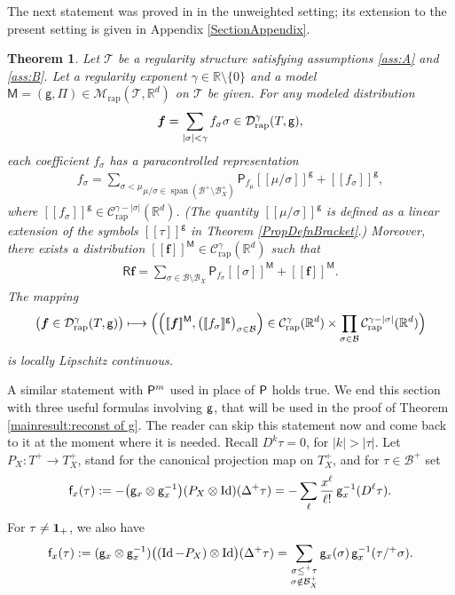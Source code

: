 \documentclass[10pt]{amsart}
\newcommand\mto{\mathchoice{\longmapsto}{\mapsto}{\mapsto}{\mapsto}}
\DeclareMathOperator{\Span}{span}
\theoremstyle{plain}
\newtheorem{thm}{Theorem}
\theoremstyle{definition}
\DeclareMathOperator{\iden}{Id}
\newcommand{\Brac}[1]{[\![#1]\!]}
\newcommand{\bsf}{\boldsymbol{f}}
\newcommand{\rap}{\mathrm{rap}}
\newcommand{\reR}{\boldsymbol{\mathsf{R}}}
\newcommand{\sfM}{\mathsf{M}}
\newcommand{\sfP}{\mathsf{P}}
\newcommand{\sff}{\mathsf{f}}
\newcommand{\sfg}{\mathsf{g}}
\newcommand{\sfPi}{\mathsf{\Pi}}
\newcommand{\scrM}{\mathscr{M}}
\newcommand{\scrT}{\mathscr{T}}
\newcommand{\bbR}{\mathbb{R}}
\newcommand{\mcB}{\mathcal{B}}
\newcommand{\mcC}{\mathcal{C}}
\newcommand{\mcD}{\mathcal{D}}
\begin{document}
The next statement was proved in \cite[Th.\,14]{BH} in the unweighted setting; its extension to the present setting is given in Appendix \ref{SectionAppendix}.

\begin{thm} \label{thm:MD to PD}
Let $\scrT$ be a regularity structure satisfying assumptions \eqref{ass:A} and \eqref{ass:B}. Let a regularity exponent $\gamma\in\bbR\setminus\{0\}$ and a model $\sfM=(\sfg,\sfPi)\in\scrM_\rap(\scrT,\bbR^d)$ on $\scrT$ be given. For any modeled distribution
\[
\bsf=\sum_{|\sigma|<\gamma}f_\sigma\sigma\in\mcD_\rap^\gamma(T,\sf g),
\]
each coefficient $f_\sigma$ has a paracontrolled representation
\begin{align}\label{eq:para system}
f_\sigma = \underset{\mu/\sigma\in\Span(\mcB^+\setminus\mcB_X^+)}{\sum_{\sigma<\mu}} \sfP_{f_\mu}\Brac{\mu/\sigma}^\sfg + \Brac{f_\sigma}^\sfg,
\end{align}
where $\Brac{f_\sigma}^\sfg\in \mcC_\rap^{\gamma-|\sigma|}(\bbR^d)$. (The quantity $\Brac{\mu/\sigma}^{\sfg}$ is defined as a linear extension of the symbols $\Brac{\tau}^{\sfg}$ in Theorem \ref{PropDefnBracket}.) Moreover, there exists a distribution $\Brac{\bsf}^\sfM\in \mcC_\rap^\gamma(\bbR^d)$ such that
\begin{align}\label{eq:para reconst}
\reR\bsf=\sum_{\sigma\in\mcB\setminus\mcB_{\underline{X}}} \sfP_{f_\sigma}\Brac{\sigma}^\sfM+\Brac{\bsf}^\sfM.
\end{align}
The mapping
\[
\bigl(\bsf\in\mcD_\rap^\gamma(T,{\sf g})\bigr)\mto \Bigl( \Bigl(\Brac{\bsf}^\sfM,\bigl(\Brac{f_\sigma}^\sfg\bigr)_{\sigma\in\mcB}\Bigr) \in \mcC^\gamma_\rap(\bbR^d)\times\prod_{\sigma\in\mcB} \mcC^{\gamma-\vert\sigma\vert}_\rap(\bbR^d) \Bigr)
\]
is locally Lipschitz continuous.
\end{thm}

A similar statement with ${\sf P}^m$ used in place of $\sf P$ holds true. We end this section with three useful formulas involving $\sf g$, that will be used in the proof of Theorem \ref{mainresult:reconst of g}. The reader can skip this statement now and come back to it at the moment where it is needed. Recall $D^k\tau=0$, for $\vert k\vert>\vert\tau\vert$. Let $P_X: T^+\to T^+_X$, stand for the canonical projection map on $T^+_X$, and for $\tau\in\mcB^+$ set
\begin{equation*}
\sff_x(\tau) := - \bigl({\sf g}_x\otimes {\sf g}_x^{-1}\bigr)(P_X\otimes\iden)(\Delta^+\tau) 
 = - \sum_{\ell}\frac{x^\ell}{\ell!} \, \sfg_x^{-1}(D^\ell\tau).
\end{equation*}
For $\tau\neq {\bf 1}_+$, we also have
\begin{equation*}
\sff_x(\tau) := ({\sf g}_x\otimes {\sf g}_x^{-1}) \bigl((\iden-P_X)\otimes\iden\bigr)
(\Delta^+\tau) = \sum_{\substack{\sigma\leq^+\tau\\\sigma\notin\mcB_X^+}} \sfg_x(\sigma)\,\sfg_x^{-1}(\tau/^+\sigma).
\end{equation*}
\end{document}
